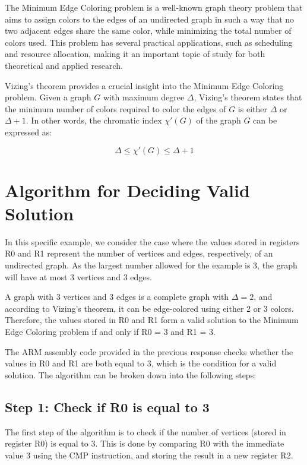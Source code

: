 The Minimum Edge Coloring problem is a well-known graph theory problem that aims to assign colors to the edges of an undirected graph in such a way that no two adjacent edges share the same color, while minimizing the total number of colors used. This problem has several practical applications, such as scheduling and resource allocation, making it an important topic of study for both theoretical and applied research.

Vizing's theorem provides a crucial insight into the Minimum Edge Coloring problem. Given a graph $G$ with maximum degree $\Delta$, Vizing's theorem states that the minimum number of colors required to color the edges of $G$ is either $\Delta$ or $\Delta + 1$. In other words, the chromatic index $\chi'(G)$ of the graph $G$ can be expressed as:

\begin{equation}
    \Delta \leq \chi'(G) \leq \Delta + 1
\end{equation}

\section{Algorithm for Deciding Valid Solution}

In this specific example, we consider the case where the values stored in registers R0 and R1 represent the number of vertices and edges, respectively, of an undirected graph. As the largest number allowed for the example is 3, the graph will have at most 3 vertices and 3 edges.

A graph with 3 vertices and 3 edges is a complete graph with $\Delta = 2$, and according to Vizing's theorem, it can be edge-colored using either 2 or 3 colors. Therefore, the values stored in R0 and R1 form a valid solution to the Minimum Edge Coloring problem if and only if R0 = 3 and R1 = 3.

The ARM assembly code provided in the previous response checks whether the values in R0 and R1 are both equal to 3, which is the condition for a valid solution. The algorithm can be broken down into the following steps:

\subsection{Step 1: Check if R0 is equal to 3}

The first step of the algorithm is to check if the number of vertices (stored in register R0) is equal to 3. This is done by comparing R0 with the immediate value 3 using the CMP instruction, and storing the result in a new register R2.

